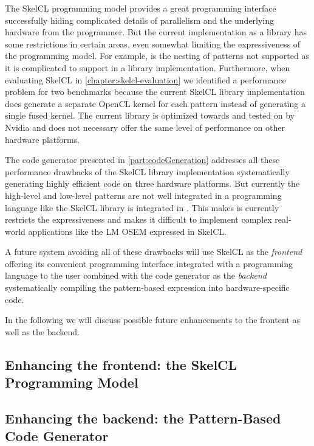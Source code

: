 The SkelCL programming model provides a great programming interface successfully hiding complicated details of parallelism and the underlying hardware from the programmer.
But the current implementation as a \Cpp library has some restrictions in certain areas, even somewhat limiting the expressiveness of the programming model.
For example, is the nesting of patterns not supported as it is complicated to support in a library implementation.
Furthermore, when evaluating SkelCL in \autoref{chapter:skelcl-evaluation} we identified a performance problem for two benchmarks because the current SkelCL library implementation does generate a separate OpenCL kernel for each pattern instead of generating a single fused kernel.
The current library is optimized towards and tested on \GPUs by Nvidia and does not necessary offer the same level of performance on other hardware platforms.

The code generator presented in \autoref{part:codeGeneration} addresses all these performance drawbacks of the SkelCL library implementation systematically generating highly efficient code on three hardware platforms.
But currently the high-level and low-level patterns are not well integrated in a programming language like the SkelCL library is integrated in \Cpp.
This makes is currently restricts the expressiveness and makes it difficult to implement complex real-world applications like the LM OSEM expressed in SkelCL.

A future system avoiding all of these drawbacks will use SkelCL as the \emph{frontend} offering its convenient programming interface integrated with a programming language to the user combined with the code generator as the \emph{backend} systematically compiling the pattern-based expression into hardware-specific code.

\bigskip
In the following we will discuss possible future enhancements to the frontent as well as the backend.

\subsection{Enhancing the frontend: the SkelCL Programming Model}

\subsection{Enhancing the backend: the Pattern-Based Code Generator}


